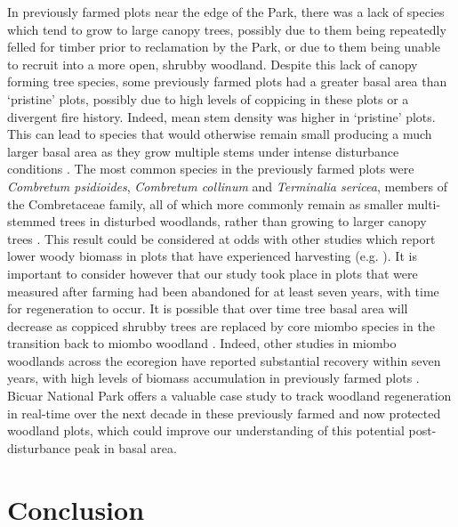 \begin{refsection}
In previously farmed plots near the edge of the Park, there was a lack of species which tend to grow to large canopy trees, possibly due to them being repeatedly felled for timber prior to reclamation by the Park, or due to them being unable to recruit into a more open, shrubby woodland. Despite this lack of canopy forming tree species, some previously farmed plots had a greater basal area than `pristine' plots, possibly due to high levels of coppicing in these plots or a divergent fire history. Indeed, mean stem density was higher in `pristine' plots. This can lead to species that would otherwise remain small producing a much larger basal area as they grow multiple stems under intense disturbance conditions \citep{Luoga2004}. The most common species in the previously farmed plots were \textit{Combretum psidioides}, \textit{Combretum collinum} and \textit{Terminalia sericea}, members of the Combretaceae family, all of which more commonly remain as smaller multi-stemmed trees in disturbed woodlands, rather than growing to larger canopy trees \citep{Wyk2014}. This result could be considered at odds with other studies which report lower woody biomass in plots that have experienced harvesting (e.g. \citealt{Muvengwi2020}). It is important to consider however that our study took place in plots that were measured after farming had been abandoned for at least seven years, with time for regeneration to occur. It is possible that over time tree basal area will decrease as coppiced shrubby trees are replaced by core miombo species in the transition back to miombo woodland \citep{Goncalves2017}. Indeed, other studies in miombo woodlands across the ecoregion have reported substantial recovery within seven years, with high levels of biomass accumulation in previously farmed plots \citep{Chidumayo2013, Goncalves2017}. Bicuar National Park offers a valuable case study to track woodland regeneration in real-time over the next decade in these previously farmed and now protected woodland plots, which could improve our understanding of this potential post-disturbance peak in basal area.

\section{Conclusion}
\label{bicuar:sec:conclusion}


\end{refsection}

